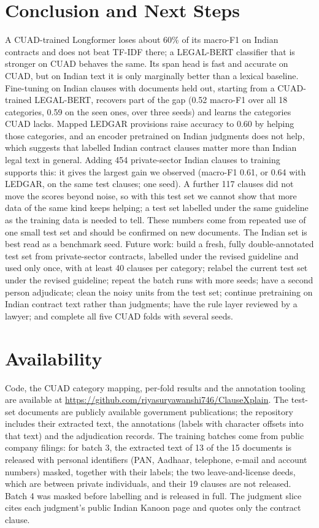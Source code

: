 \documentclass[conference]{IEEEtran}
\begin{document}
\section{Conclusion and Next Steps}\label{sec:next}
A CUAD-trained Longformer loses about 60\% of its macro-F1 on Indian contracts and does not beat TF-IDF there; a LEGAL-BERT classifier that is stronger on CUAD behaves the same. Its span head is fast and accurate on CUAD, but on Indian text it is only marginally better than a lexical baseline. Fine-tuning on Indian clauses with documents held out, starting from a CUAD-trained LEGAL-BERT, recovers part of the gap (0.52 macro-F1 over all 18 categories, 0.59 on the seen ones, over three seeds) and learns the categories CUAD lacks. Mapped LEDGAR provisions raise accuracy to 0.60 by helping those categories, and an encoder pretrained on Indian judgments does not help, which suggests that labelled Indian contract clauses matter more than Indian legal text in general. Adding 454 private-sector Indian clauses to training supports this: it gives the largest gain we observed (macro-F1 0.61, or 0.64 with LEDGAR, on the same test clauses; one seed). A further 117 clauses did not move the scores beyond noise, so with this test set we cannot show that more data of the same kind keeps helping; a test set labelled under the same guideline as the training data is needed to tell. These numbers come from repeated use of one small test set and should be confirmed on new documents. The Indian set is best read as a benchmark seed. Future work: build a fresh, fully double-annotated test set from private-sector contracts, labelled under the revised guideline and used only once, with at least 40 clauses per category; relabel the current test set under the revised guideline; repeat the batch runs with more seeds; have a second person adjudicate; clean the noisy units from the test set; continue pretraining on Indian contract text rather than judgments; have the rule layer reviewed by a lawyer; and complete all five CUAD folds with several seeds.

\section*{Availability}
Code, the CUAD category mapping, per-fold results and the annotation tooling are available at \url{https://github.com/riyasuryawanshi746/ClauseXplain}. The test-set documents are publicly available government publications; the repository includes their extracted text, the annotations (labels with character offsets into that text) and the adjudication records. The training batches come from public company filings: for batch 3, the extracted text of 13 of the 15 documents is released with personal identifiers (PAN, Aadhaar, telephone, e-mail and account numbers) masked, together with their labels; the two leave-and-license deeds, which are between private individuals, and their 19 clauses are not released. Batch 4 was masked before labelling and is released in full. The judgment slice cites each judgment's public Indian Kanoon page and quotes only the contract clause.
\end{document}
